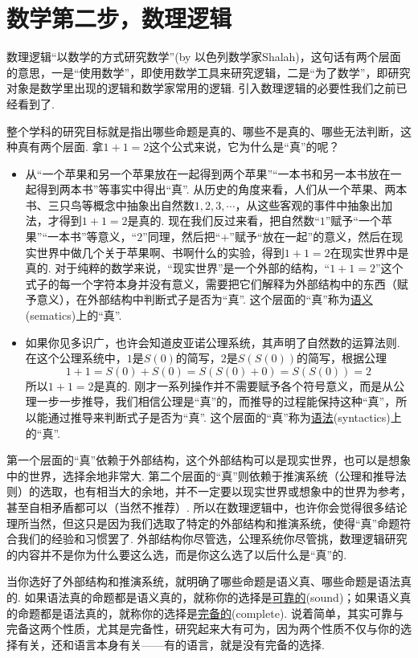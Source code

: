 \documentclass[main.tex]{subfiles}
\begin{document}
\section{数学第二步，数理逻辑}

数理逻辑“以数学的方式研究数学”(by 以色列数学家Shalah)，这句话有两个层面的意思，一是“使用数学”，即使用数学工具来研究逻辑，二是“为了数学”，即研究对象是数学里出现的逻辑和数学家常用的逻辑. 引入数理逻辑的必要性我们之前已经看到了. 

整个学科的研究目标就是指出哪些命题是真的、哪些不是真的、哪些无法判断，这种真有两个层面. 拿\(1+1=2\)这个公式来说，它为什么是“真”的呢？
\begin{itemize}
    \item 从“一个苹果和另一个苹果放在一起得到两个苹果”“一本书和另一本书放在一起得到两本书”等事实中得出“真”. 从历史的角度来看，人们从一个苹果、两本书、三只鸟等概念中抽象出自然数\(1,2,3,\cdots\)，从这些客观的事件中抽象出加法，才得到\(1+1=2\)是真的. 现在我们反过来看，把自然数“\(1\)”赋予“一个苹果”“一本书”等意义，“\(2\)”同理，然后把“\(+\)”赋予“放在一起”的意义，然后在现实世界中做几个关于苹果啊、书啊什么的实验，得到\(1+1=2\)在现实世界中是真的. 对于纯粹的数学来说，“现实世界”是一个外部的结构，“\(1+1=2\)”这个式子的每一个字符本身并没有意义，需要把它们解释为外部结构中的东西（赋予意义），在外部结构中判断式子是否为“真”. 这个层面的“真”称为\uline{语义}(sematics)上的“真”.
    \item 如果你见多识广，也许会知道皮亚诺公理系统，其声明了自然数的运算法则. 在这个公理系统中，\(1\)是\(S(0)\)的简写，\(2\)是\(S(S(0))\)的简写，根据公理
    \[1+1=S(0)+S(0)=S(S(0)+0)=S(S(0))=2\]
    所以\(1+1=2\)是真的. 刚才一系列操作并不需要赋予各个符号意义，而是从公理一步一步推导，我们相信公理是“真”的，而推导的过程能保持这种“真”，所以能通过推导来判断式子是否为“真”. 这个层面的“真”称为\uline{语法}(syntactics)上的“真”.
\end{itemize}

第一个层面的“真”依赖于外部结构，这个外部结构可以是现实世界，也可以是想象中的世界，选择余地非常大. 第二个层面的“真”则依赖于推演系统（公理和推导法则）的选取，也有相当大的余地，并不一定要以现实世界或想象中的世界为参考，甚至自相矛盾都可以（当然不推荐）. 所以在数理逻辑中，也许你会觉得很多结论理所当然，但这只是因为我们选取了特定的外部结构和推演系统，使得“真”命题符合我们的经验和习惯罢了. 外部结构你尽管选，公理系统你尽管挑，数理逻辑研究的内容并不是你为什么要这么选，而是你这么选了以后什么是“真”的.

当你选好了外部结构和推演系统，就明确了哪些命题是语义真、哪些命题是语法真的. 如果语法真的命题都是语义真的，就称你的选择是\uline{可靠的}(sound)；如果语义真的命题都是语法真的，就称你的选择是\uline{完备的}(complete). 说着简单，其实可靠与完备这两个性质，尤其是完备性，研究起来大有可为，因为两个性质不仅与你的选择有关，还和语言本身有关——有的语言，就是没有完备的选择. 
\end{document}
